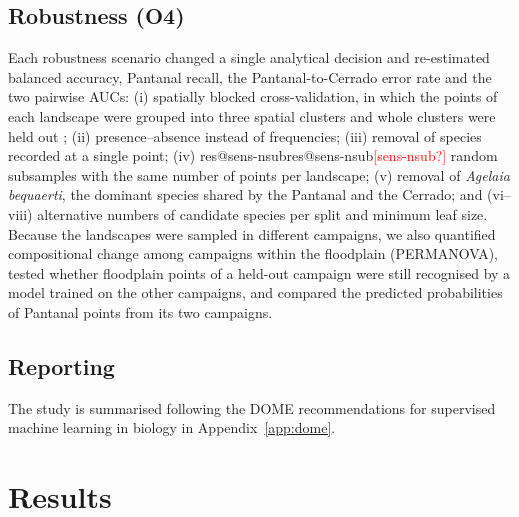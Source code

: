 \documentclass[10pt,a4paper,twocolumn]{article}
\makeatletter
\newcommand{\res}[1]{\ifcsname res@#1\endcsname\csname res@#1\endcsname\else\textcolor{red}{[#1?]}\fi}
\newcommand{\taxon}[1]{\textit{#1}}
\makeatother
\begin{document}
\subsection{Robustness (O4)}\label{sec:mrobust}
Each robustness scenario changed a single analytical decision and re-estimated balanced accuracy,
Pantanal recall, the Pantanal-to-Cerrado error rate and the two pairwise AUCs: (i) spatially blocked
cross-validation, in which the points of each landscape were grouped into three spatial clusters and
whole clusters were held out \citep{roberts2017}; (ii) presence--absence instead of frequencies;
(iii) removal of species recorded at a single point; (iv) \res{sens-nsub} random subsamples with the
same number of points per landscape; (v) removal of \taxon{Agelaia bequaerti}, the dominant species
shared by the Pantanal and the Cerrado; and (vi--viii) alternative numbers of candidate species per
split and minimum leaf size. Because the landscapes were sampled in different campaigns, we also
quantified compositional change among campaigns within the floodplain (PERMANOVA), tested whether
floodplain points of a held-out campaign were still recognised by a model trained on the other
campaigns, and compared the predicted probabilities of Pantanal points from its two campaigns.

\subsection{Reporting}\label{sec:reporting}
The study is summarised following the DOME recommendations for supervised machine learning in
biology \citep{walsh2021} in Appendix~\ref{app:dome}.

\section{Results}\label{sec:results}
\end{document}
